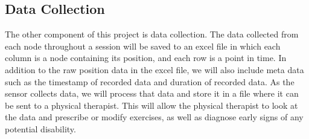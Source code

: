 \documentclass[onecolumn, draftclsnofoot,10pt, compsoc]{IEEEtran}
\begin{document}
\subsection{Data Collection}

The other component of this project is data collection. The data collected from each node throughout a session will be saved to an excel file in which each column is a node containing its position, and each row is a point in time. In addition to the raw position data in the excel file, we will also include meta data such as the timestamp of recorded data and duration of recorded data. As the sensor collects data, we will process that data and store it in a file where it can be sent to a physical therapist. This will allow the physical therapist to look at the data and prescribe or modify exercises, as well as diagnose early signs of any potential disability.
\end{document}
